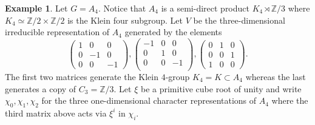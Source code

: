 \documentclass[11pt]{amsart}
\theoremstyle{plain}
\numberwithin{equation}{section}
\theoremstyle{definition}
\newtheorem{example}[theorem]{Example}
\theoremstyle{remark}
\begin{document}
\begin{example}\label{example:A4}
Let $G=A_4$. Notice that $A_4$ is a semi-direct product $K_4 \rtimes \mathbb{Z}/3$ where $K_4 \simeq \mathbb{Z}/2 \times \mathbb{Z}/2$ is the Klein four subgroup. 
Let $V$ be the three-dimensional irreducible representation of $A_4$ generated by the elements
\[
	\begin{pmatrix}
	1 & 0 & 0 \\
	0 & -1 & 0 \\
	0 & 0  & -1
	\end{pmatrix},
	\begin{pmatrix}
	-1 & 0 & 0 \\
	0 & 1 & 0 \\
	0 & 0  & -1 \\
	\end{pmatrix},
	\begin{pmatrix}
	0 & 1 & 0 \\
	0 & 0 & 1 \\
	1 & 0  & 0
	\end{pmatrix}.
\]	
The first two matrices generate the Klein $4$-group $K_4=K \subset A_4$ whereas the last generates a copy of $C_3=\mathbb{Z}/3$. Let $\xi$ be a primitive cube root of unity and write $\chi_0,\chi_1,\chi_2$ for the three one-dimensional character representations of $A_4$ where the third matrix above acts via $\xi^i$ in $\chi_i$.

\medskip


\end{example}
\end{document}
